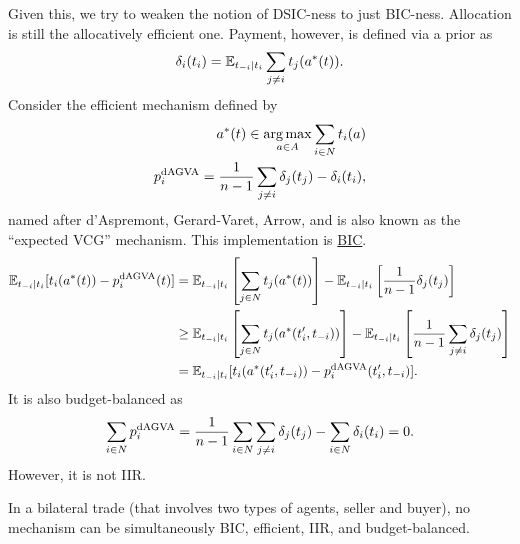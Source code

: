 		Given this, we try to weaken the notion of DSIC-ness to just BIC-ness. Allocation is still the allocatively efficient one. Payment, however, is defined via a prior as
		\[ \delta_i(t_i) = \mathbb{E}_{t_{-i} | t_i} \sum_{j \ne i} t_j(a^*(t)). \]
		Consider the efficient mechanism defined by
		\begin{align*}
			a^*(t) \in \operatorname*{arg\,max}_{a \in A} \sum_{i \in N} t_i(a) \\
			p_i^\text{dAGVA} = \frac{1}{n-1} \sum_{j \ne i} \delta_j(t_j) - \delta_i(t_i),
		\end{align*}
		named after d'Aspremont, Gerard-Varet, Arrow, and is also known as the ``expected VCG'' mechanism. This implementation is \hyperref[def: bic]{BIC}.
		\begin{align*}
			\mathbb{E}_{t_{-i} | t_i}[t_i(a^*(t)) - p_i^{\text{dAGVA}}(t)] &= \mathbb{E}_{t_{-i}|t_i} \left[ \sum_{j \in N} t_j(a^*(t)) \right] - \mathbb{E}_{t_{-i}|t_i} \left[ \frac{1}{n-1} \delta_j(t_j) \right] \\
				&\ge \mathbb{E}_{t_{-i}|t_i} \left[ \sum_{j \in N} t_j(a^*(t_i',t_{-i})) \right] - \mathbb{E}_{t_{-i}|t_i} \left[ \frac{1}{n-1}\sum_{j \ne i} \delta_j(t_j) \right] \\
				&= \mathbb{E}_{t_{-i}|t_i}[t_i(a^*(t_i',t_{-i})) - p_i^{\text{dAGVA}}(t_i',t_{-i})].
		\end{align*}
		It is also budget-balanced as
		\[ \sum_{i \in N} p_i^{\text{dAGVA}} = \frac{1}{n-1} \sum_{i \in N} \sum_{j \ne i} \delta_j(t_j) - \sum_{i \in N} \delta_i(t_i) = 0. \]
		However, it is not IIR.

		\begin{ftheo}
			In a bilateral trade (that involves two types of agents, seller and buyer), no mechanism can be simultaneously BIC, efficient, IIR, and budget-balanced.
		\end{ftheo}